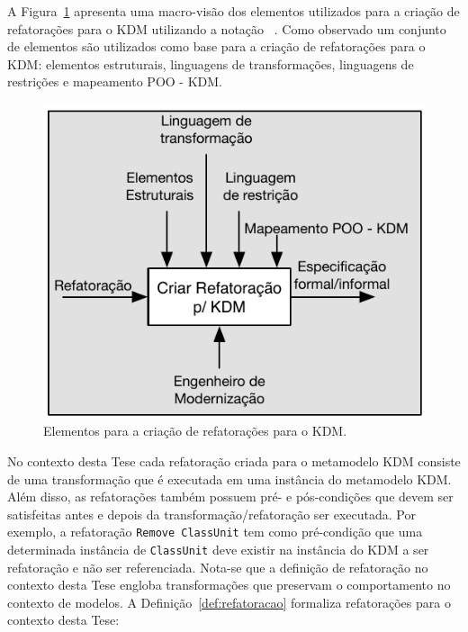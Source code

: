 A Figura~\ref{fig:diretrizes_kdm_refatoracao_capitulo} apresenta uma macro-visão dos elementos utilizados para a criação de refatorações para o KDM utilizando a notação ~\cite{Marca_1987}. Como observado um conjunto de elementos são utilizados como base para a criação de refatorações para o KDM: elementos estruturais, linguagens de transformações, linguagens de restrições e mapeamento POO - KDM. 

\begin{figure}[h]
	\centering
	\caption{Elementos para a criação de refatorações para o KDM.}
	\label{fig:diretrizes_kdm_refatoracao_capitulo}
	\includegraphics[scale=0.9]{images/criar_refatoracao_kdm}
	\fautor
\end{figure}

No contexto desta Tese cada refatoração criada para o metamodelo KDM consiste de uma transformação que é executada em uma instância do metamodelo KDM. Além disso, as refatorações também possuem pré- e pós-condições que devem ser satisfeitas antes e depois da transformação/refatoração ser executada. Por exemplo, a refatoração \texttt{Remove ClassUnit} tem como pré-condição que uma determinada instância de \texttt{ClassUnit} deve existir na instância do KDM a ser refatoração e não ser referenciada. Nota-se que a definição de refatoração no contexto desta Tese engloba transformações que preservam o comportamento no contexto de modelos. A Definição~\ref{def:refatoracao} formaliza refatorações para o contexto desta Tese:


